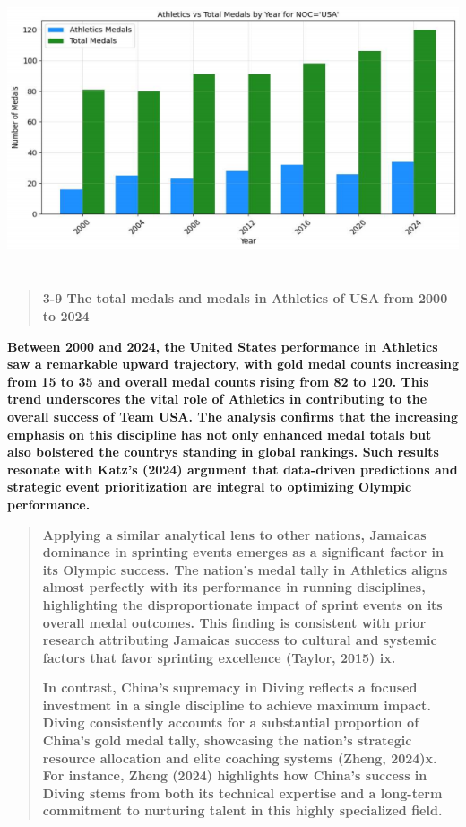 \documentclass[12pt,a4paper]{article}
\renewenvironment{quote}{\begin{quotation}}{\end{quotation}}  %
\begin{document}
    \includegraphics[width=6.30167in,height=3.37333in]{./media/media/image17.png}
    
    \begin{quote}
    \textbf{3-9 The total medals and medals in Athletics of USA from 2000 to
    2024}
    \end{quote}
    
    \textbf{Between 2000 and 2024, the United States\textquotesingle{}
    performance in Athletics saw a remarkable upward trajectory, with gold
    medal counts increasing from 15 to 35 and overall medal counts rising
    from 82 to 120. This trend underscores the vital role of Athletics in
    contributing to the overall success of Team USA. The analysis confirms
    that the increasing emphasis on this discipline has not only enhanced
    medal totals but also bolstered the country\textquotesingle s standing
    in global rankings. Such results resonate with Katz's (2024) argument
    that data-driven predictions and strategic event prioritization are
    integral to optimizing Olympic performance.}
    
    \begin{quote}
    \textbf{Applying a similar analytical lens to other nations,
    Jamaica\textquotesingle s dominance in sprinting events emerges as a
    significant factor in its Olympic success. The nation's medal tally in
    Athletics aligns almost perfectly with its performance in running
    disciplines, highlighting the disproportionate impact of sprint events
    on its overall medal outcomes. This finding is consistent with prior
    research attributing Jamaica\textquotesingle s success to cultural and
    systemic factors that favor sprinting excellence (Taylor, 2015) ix.}
    
    \textbf{In contrast, China's supremacy in Diving reflects a focused
    investment in a single discipline to achieve maximum impact. Diving
    consistently accounts for a substantial proportion of China's gold medal
    tally, showcasing the nation's strategic resource allocation and elite
    coaching systems (Zheng, 2024)x. For instance, Zheng (2024) highlights
    how China's success in Diving stems from both its technical expertise
    and a long-term commitment to nurturing talent in this highly
    specialized field.}
    \end{quote}
    
\end{document}
